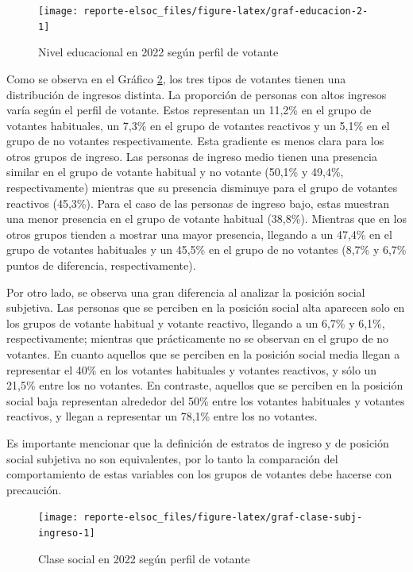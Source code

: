 \documentclass[
  12pt,
]{book}
\begin{document}
\begin{figure}

{\centering \texttt{[image: reporte-elsoc\_files/figure-latex/graf-educacion-2-1]} 

}

\caption{Nivel educacional en 2022 según perfil de votante}\label{fig:graf-educacion-2}
\end{figure}

Como se observa en el Gráfico \ref{fig:graf-clase-subj-ingreso}, los tres tipos de votantes tienen una distribución de ingresos distinta. La proporción de personas con altos ingresos varía según el perfil de votante. Estos representan un 11,2\% en el grupo de votantes habituales, un 7,3\% en el grupo de votantes reactivos y un 5,1\% en el grupo de no votantes respectivamente. Esta gradiente es menos clara para los otros grupos de ingreso. Las personas de ingreso medio tienen una presencia similar en el grupo de votante habitual y no votante (50,1\% y 49,4\%, respectivamente) mientras que su presencia disminuye para el grupo de votantes reactivos (45,3\%). Para el caso de las personas de ingreso bajo, estas muestran una menor presencia en el grupo de votante habitual (38,8\%). Mientras que en los otros grupos tienden a mostrar una mayor presencia, llegando a un 47,4\% en el grupo de votantes habituales y un 45,5\% en el grupo de no votantes (8,7\% y 6,7\% puntos de diferencia, respectivamente).

Por otro lado, se observa una gran diferencia al analizar la posición social subjetiva. Las personas que se perciben en la posición social alta aparecen solo en los grupos de votante habitual y votante reactivo, llegando a un 6,7\% y 6,1\%, respectivamente; mientras que prácticamente no se observan en el grupo de no votantes. En cuanto aquellos que se perciben en la posición social media llegan a representar el 40\% en los votantes habituales y votantes reactivos, y sólo un 21,5\% entre los no votantes. En contraste, aquellos que se perciben en la posición social baja representan alrededor del 50\% entre los votantes habituales y votantes reactivos, y llegan a representar un 78,1\% entre los no votantes.

Es importante mencionar que la definición de estratos de ingreso y de posición social subjetiva no son equivalentes, por lo tanto la comparación del comportamiento de estas variables con los grupos de votantes debe hacerse con precaución.

\begin{figure}

{\centering \texttt{[image: reporte-elsoc\_files/figure-latex/graf-clase-subj-ingreso-1]} 

}

\caption{Clase social en 2022 según perfil de votante}\label{fig:graf-clase-subj-ingreso}
\end{figure}
\end{document}
